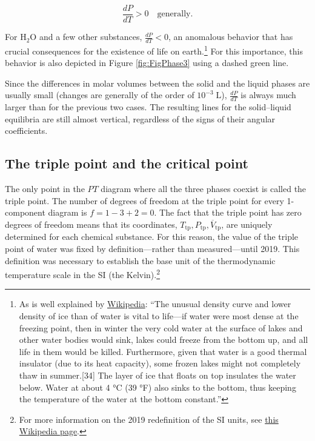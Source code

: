 \documentclass[
  9pt,
]{extbook}
\theoremstyle{definition}
\theoremstyle{definition}
\theoremstyle{definition}
\theoremstyle{definition}
\theoremstyle{remark}
\begin{document}
\begin{equation}
 \frac{dP}{dT} > 0 \quad \text{generally}.
\label{eq:PTd2}
\end{equation}

For \(\mathrm{H}_2\mathrm{O}\) and a few other substances, \(\frac{dP}{dT}<0\), an anomalous behavior that has crucial consequences for the existence of life on earth.\footnote{As is well explained by \href{https://en.wikipedia.org/wiki/Properties_of_water\#Density_of_water_and_ice}{Wikipedia}: ``The unusual density curve and lower density of ice than of water is vital to life---if water were most dense at the freezing point, then in winter the very cold water at the surface of lakes and other water bodies would sink, lakes could freeze from the bottom up, and all life in them would be killed. Furthermore, given that water is a good thermal insulator (due to its heat capacity), some frozen lakes might not completely thaw in summer.{[}34{]} The layer of ice that floats on top insulates the water below. Water at about 4 °C (39 °F) also sinks to the bottom, thus keeping the temperature of the water at the bottom constant.''} For this importance, this behavior is also depicted in Figure \ref{fig:FigPhase3} using a dashed green line.

Since the differences in molar volumes between the solid and the liquid phases are usually small (changes are generally of the order of \(10^{-3}\;\mathrm{L}\)), \(\frac{dP}{dT}\) is always much larger than for the previous two cases. The resulting lines for the solid--liquid equilibria are still almost vertical, regardless of the signs of their angular coefficients.

\subsection{The triple point and the critical point}\label{the-triple-point-and-the-critical-point}

The only point in the \(PT\) diagram where all the three phases coexist is called the triple point. The number of degrees of freedom at the triple point for every 1-component diagram is \(f=1-3+2=0\). The fact that the triple point has zero degrees of freedom means that its coordinates, \({T_{\text{tp}},P_{\text{tp}},\overline{V}_{\text{tp}}}\), are uniquely determined for each chemical substance. For this reason, the value of the triple point of water was fixed by definition---rather than measured---until 2019. This definition was necessary to establish the base unit of the thermodynamic temperature scale in the SI (the Kelvin).\footnote{For more information on the 2019 redefinition of the SI units, see \href{https://en.wikipedia.org/wiki/2019_redefinition_of_the_SI_base_units}{this Wikipedia page}.}
\end{document}
